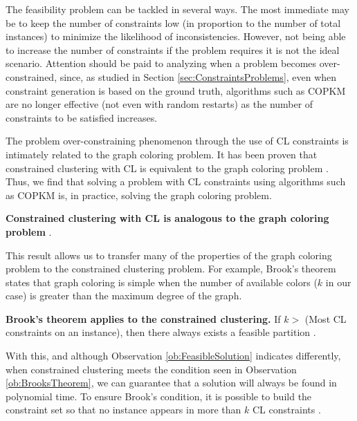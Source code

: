 The feasibility problem can be tackled in several ways. The most immediate may be to keep the number of constraints low (in proportion to the number of total instances) to minimize the likelihood of inconsistencies. However, not being able to increase the number of constraints if the problem requires it is not the ideal scenario. Attention should be paid to analyzing when a problem becomes over-constrained, since, as studied in Section \ref{sec:ConstraintsProblems}, even when constraint generation is based on the ground truth, algorithms such as \acs{COPKM} are no longer effective (not even with random restarts) as the number of constraints to be satisfied increases.

The problem over-constraining phenomenon through the use of \acs{CL} constraints is intimately related to the graph coloring problem. It has been proven that constrained clustering with \acs{CL} is equivalent to the graph coloring problem \cite{davidson2006identifying}. Thus, we find that solving a problem with \acs{CL} constraints using algorithms such as \acs{COPKM} is, in practice, solving the graph coloring problem.

\begin{observation}
	
	\textbf{Constrained clustering with \acs{CL} is analogous to the graph coloring problem} \cite{davidson2007survey}.
	
\end{observation}

This result allows us to transfer many of the properties of the graph coloring problem to the constrained clustering problem. For example, Brook's theorem states that graph coloring is simple when the number of available colors ($k$ in our case) is greater than the maximum degree of the graph.

\begin{observation}
	
	\textbf{Brook's theorem applies to the constrained clustering.}
	If $ k > $ (Most \acs{CL} constraints on an instance), then there always exists a feasible partition \cite{davidson2007survey} \label{ob:BrooksTheorem}.
	
\end{observation}

With this, and although Observation \ref{ob:FeasibleSolution} indicates differently, when constrained clustering meets the condition seen in Observation \ref{ob:BrooksTheorem}, we can guarantee that a solution will always be found in polynomial time. To ensure Brook's condition, it is possible to build the constraint set so that no instance appears in more than $k$ \acs{CL} constraints \cite{davidson2006identifying}.


